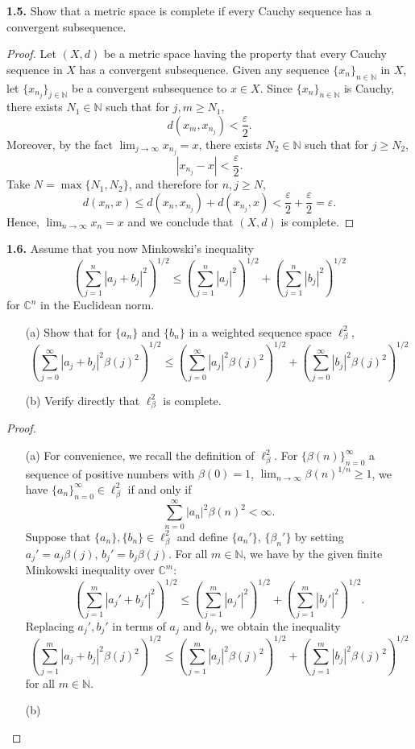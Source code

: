 \documentclass[12pt]{article}
\theoremstyle{definition}
\begin{document}
\noindent \textbf{1.5.} Show that a metric space is complete if every Cauchy sequence has a convergent subsequence. 
	\begin{proof}
		Let $(X, d)$ be a metric space having the property that every Cauchy sequence in $X$ has a convergent subsequence. Given any sequence $\{x_n\}_{n \in \mathbb{N}}$ in $X$, let $\{x_{n_j}\}_{j \in \mathbb{N}}$ be a convergent subsequence to $x \in X$. Since $\{x_n\}_{n \in \mathbb{N}}$ is Cauchy, there exists $N_1 \in \mathbb{N}$ such that for $j, m \geq N_1$, $$d(x_m, x_{n_j}) < \frac{\varepsilon}{2}.$$ Moreover, by the fact $\lim_{j \to \infty} x_{n_j} = x$, there exists $N_2 \in \mathbb{N}$ such that for $j \geq N_2$, $$|x_{n_j} - x| < \frac{\varepsilon}{2}.$$ Take $N = \max\{N_1, N_2\}$, and therefore for $n, j \geq N$, 
		 $$d(x_n, x) \leq d(x_n, x_{n_j}) + d(x_{n_j}, x) < \frac{\varepsilon}{2} + \frac{\varepsilon}{2} = \varepsilon.$$ Hence, $\lim_{n \to \infty} x_n = x$ and we conclude that $(X, d)$ is complete.
	\end{proof} 
	
\noindent \textbf{1.6.} Assume that you now Minkowski's inequality $$\left(\sum_{j = 1}^n |a_j + b_j|^2\right)^{1/2} \leq \left(\sum_{j = 1}^n |a_j|^2\right)^{1/2} + \left(\sum_{j = 1}^n |b_j|^2\right)^{1/2}$$ for $\mathbb{C}^n$ in the Euclidean norm. 
	\begin{itemize}
		\item[(a)] Show that for $\{a_n\}$ and $\{b_n\}$ in a weighted sequence space $\ell_\beta^2$, $$\left(\sum_{j = 0}^\infty |a_j + b_j|^2 \beta(j)^2\right)^{1/2} \leq \left(\sum_{j = 0}^\infty |a_j|^2 \beta(j)^2 \right)^{1/2} + \left(\sum_{j = 0}^\infty |b_j|^2 \beta(j)^2\right)^{1/2}$$ 
		
		\item[(b)] Verify directly that $\ell_\beta^2$ is complete. 
	\end{itemize}
	
	\begin{proof} ~
		\begin{itemize}
			\item[(a)] For convenience, we recall the definition of $\ell_\beta^2$. For $\{\beta(n)\}_{n = 0}^\infty$ a sequence of positive numbers with $\beta(0) = 1$, $\lim_{n \to \infty} \beta(n)^{1/n} \geq 1$, we have $\{a_n\}_{n = 0}^\infty \in \ell_\beta^2$ if and only if $$\sum_{n = 0}^\infty |a_n|^2 \beta(n)^2 < \infty.$$ 
			Suppose that $\{a_n\}, \{b_n\} \in \ell_\beta^2$ and define $\{a_n'\}$, $\{\beta_n'\}$ by setting $a_j' = a_j \beta(j)$, $b_j' = b_j \beta(j)$. For all $m \in \mathbb{N}$, we have by the given finite Minkowski inequality over $\mathbb{C}^m$: $$\left(\sum_{j = 1}^m |a_j' + b_j'|^2\right)^{1/2} \leq \left(\sum_{j = 1}^m |a_j'|^2\right)^{1/2} + \left(\sum_{j = 1}^m |b_j'|^2\right)^{1/2}.$$ Replacing $a_j', b_j'$ in terms of $a_j$ and $b_j$, we obtain the inequality $$\left(\sum_{j = 1}^m |a_j + b_j|^2\beta(j)^2\right)^{1/2} \leq \left(\sum_{j = 1}^m |a_j|^2 \beta(j)^2\right)^{1/2} + \left(\sum_{j = 1}^m |b_j|^2 \beta(j)^2\right)^{1/2}$$ for all $m \in \mathbb{N}$. 
			\item[(b)] 
		\end{itemize}
	\end{proof}
\end{document}
